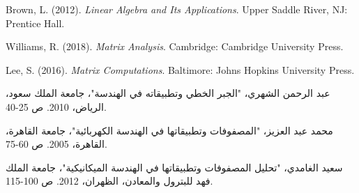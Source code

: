 \documentclass{arabicClass}
\begin{document}
	\abovedisplayskip=7pt
	\belowdisplayskip=7pt
	
	\amiri
	
	
	
	\arabicfont
	\tableofcontents
	\clearpage
	
%	
	
	
	
	
	
\begin{thebibliography}{9}
\begin{english}
	Brown, L. (2012). \textit{Linear Algebra and Its Applications}. Upper Saddle River, NJ: Prentice Hall.
	
	Williams, R. (2018). \textit{Matrix Analysis}. Cambridge: Cambridge University Press.
	
	Lee, S. (2016). \textit{Matrix Computations}. Baltimore: Johns Hopkins University Press.
\end{english}
	
	عبد الرحمن الشهري، "الجبر الخطي وتطبيقاته في الهندسة"، جامعة الملك سعود، الرياض، 2010. ص 25-40.
	
	محمد عبد العزيز، "المصفوفات وتطبيقاتها في الهندسة الكهربائية"، جامعة القاهرة، القاهرة، 2005. ص 60-75.
	
	سعيد الغامدي، "تحليل المصفوفات وتطبيقاتها في الهندسة الميكانيكية"، جامعة الملك فهد للبترول والمعادن، الظهران، 2012. ص 100-115.
	
\end{thebibliography}
\end{document}
